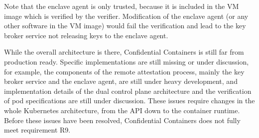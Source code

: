 Note that the enclave agent is only trusted, because it is included in the VM
image which is verified by the verifier. Modification of the enclave agent (or
any other software in the VM image) would fail the verification and lead to the
key broker service not releasing keys to the enclave agent.

While the overall architecture is there, Confidential Containers is still far
from production ready. Specific implementations are still missing or under
discussion, for example, the components of the remote attestation process,
mainly the key broker service and the enclave agent, are still under heavy
development, and implementation details of the dual control plane architecture
and the verification of pod specifications are still under discussion. These
issues require changes in the whole Kubernetes architecture, from the API down
to the container runtime. Before these issues have been resolved, Confidential
Containers does not fully meet requirement R9.
